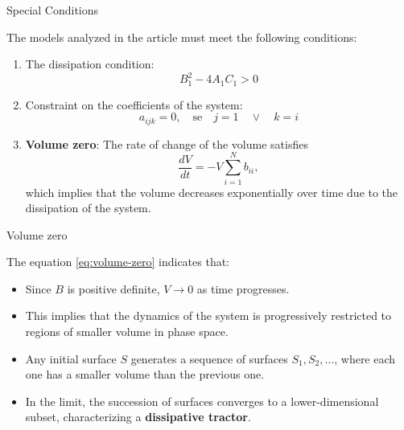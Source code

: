 
\begin{frame}{Special Conditions}
	
	The models analyzed in the article \cite{lorenz1980} must meet the following conditions:
	
	\begin{enumerate}
		\item The dissipation condition:
		      \begin{equation}
		      	B_1^2 - 4A_1C_1 > 0 \label{eq:condition-sis}
		      \end{equation}
		      
		\item Constraint on the coefficients of the system:
		      \begin{equation*}
		      	a_{ijk} = 0, \quad \text{se} \quad j=1 \quad \vee \quad k = i
		      \end{equation*}
		      
		\item \textbf{Volume zero}: The rate of change of the volume satisfies
		      \begin{equation}
		      	\frac{dV}{dt} = - V \sum_{i=1}^{N} b_{ii}, \label{eq:volume-zero}
		      \end{equation}
		      which implies that the volume decreases exponentially over time due to the dissipation of the system.
	\end{enumerate}
	
\end{frame}


\begin{frame}{Volume zero}
	
	The equation \eqref{eq:volume-zero} indicates that:
	\begin{itemize}
		\item Since $B$ is positive definite, $V \to 0$ as time progresses.
		\item This implies that the dynamics of the system is progressively restricted to regions of smaller volume in phase space.
		\item Any initial surface $S$ generates a sequence of surfaces $S_1, S_2, \dots$, where each one has a smaller volume than the previous one.
		\item In the limit, the succession of surfaces converges to a lower-dimensional subset, characterizing a \textbf{dissipative tractor}.
	\end{itemize}
	
\end{frame}


